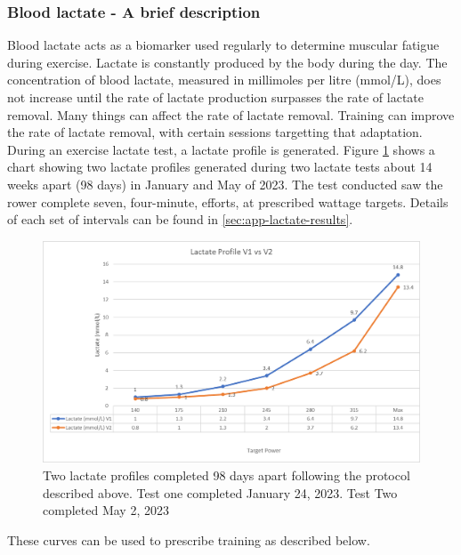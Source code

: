 \subsubsection{Blood lactate - A brief description}
Blood lactate acts as a biomarker used regularly to determine muscular fatigue during exercise. Lactate is constantly produced by the body during the day. The concentration of blood lactate, measured in millimoles per litre (mmol/L), does not increase until the rate of lactate production surpasses the rate of lactate removal. Many things can affect the rate of lactate removal. Training can improve the rate of lactate removal, with certain sessions targetting that adaptation. During an exercise lactate test, a lactate profile is generated. Figure \ref{fig:lactateGraph} shows a chart showing two lactate profiles generated during two lactate tests about 14 weeks apart (98 days) in January and May of 2023. The test conducted saw the rower complete seven, four-minute, efforts, at prescribed wattage targets. Details of each set of intervals can be found in \ref{sec:app-lactate-results}.
\begin{figure}
  \centering
  \includegraphics[width=\linewidth]{figures/lactateGraph.png}
  \caption[Lactate Profiles from January and May 2023]{Two lactate profiles completed 98 days apart following the protocol described above. Test one completed January 24, 2023. Test Two completed May 2, 2023}
  \label{fig:lactateGraph}
\end{figure}
These curves can be used to prescribe training as described below.

